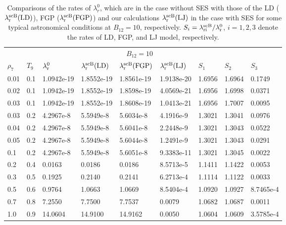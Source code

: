 \documentclass[manuscript]{aastex}
\begin{document}
\begin{table*}[htb]\footnotesize
\centering \caption{Comparisons of the rates of $\lambda^0_{r}$,
which are in the case without SES with those of the
 LD ($\lambda^{\rm{scB}}_{\rm{r}}(\rm{LD})$), FGP ($\lambda^{\rm{scB}}_{\rm{r}}(\rm{FGP})$) and our calculations
$\lambda^{\rm{scB}}_{\rm{r}}(\rm{LJ})$ in the case with SES for some
typical
 astronomical conditions at $B_{12}=10$, respectively.
$S_i=\lambda_{\rm{r} {i}}^{\rm{scB}}/\lambda_{\rm{r}}^0$, $i=1, 2,
3$ denote the rates of LD, FGP, and LJ model, respectively.}
\begin{minipage}{140mm}
\begin{tabular}{lllllllll}
\hline \hline
\multicolumn{5}{r}{$B_{12}=10$} \\
\cline{4-6}
$\rho_7$ &$T_9$ & $\lambda^0_{\rm{r}}$ &$\lambda^{\rm{scB}}_{\rm{r}}(\rm{LD})$  &$\lambda^{\rm{scB}}_{\rm{r}}(\rm{FGP})$ &$\lambda^{\rm{scB}}_{\rm{r}}(\rm{LJ})$ &$S_{1}$ &$S_2$ &$S_3$\\
\hline
 0.01 &0.1 &1.0942e-19   &1.8552e-19   &1.8561e-19   &1.9138e-20  &1.6956  &1.6964  &0.1749\\
 0.02&0.1&1.0942e-19&1.8552e-19&1.8598e-19&4.0569e-21&1.6956&1.6998&0.0371\\
 0.03&0.1&1.0942e-19&1.8552e-19&1.8608e-19&1.0413e-21&1.6956&1.7007&0.0095\\
 0.03 &0.2 &4.2967e-8   &5.5949e-8   &5.6034e-8   &4.1916e-9   &1.3021  &1.3041  &0.0976\\
 0.04&0.2&4.2967e-8&5.5949e-8&5.6041e-8&2.2448e-9&1.3021&1.3043&0.0522\\
 0.05 &0.2 &4.2967e-8   &5.5949e-8   &5.6044e-8   &1.2491e-9   &1.3021  &1.3043  &0.0291\\
 0.1 &0.2 &4.2967e-8   &5.5949e-8   &5.6051e-8   &9.3383e-11  &1.3021  &1.3045  &0.0022\\
 0.2 &0.4 &0.0163  &0.0186  &0.0186  &8.5713e-5   &1.1411  &1.1422  &0.0053\\
 0.3 &0.5 &0.1925  &0.2140  &0.2141  &6.2713e-4   &1.1114  &1.1122  &0.0033\\
 0.5 &0.6 &0.9764  &1.0663  &1.0669  &8.5404e-4   &1.0920  &1.0927  &8.7465e-4\\
 0.7 &0.8 &7.2550  &7.7500  &7.7537  &0.0079  &1.0682  &1.0687  &0.0011\\
 1.0 &0.9 &14.0604 &14.9100 &14.9162 &0.0050  &1.0604  &1.0609  &3.5785e-4\\

\hline
\end{tabular}
\end{minipage}
\end{table*}
\end{document}

